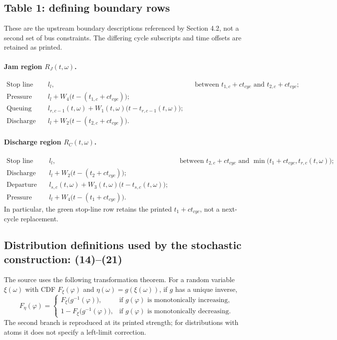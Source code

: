 \documentclass{article}
\begin{document}
\subsection*{Table 1: defining boundary rows}
These are the upstream boundary descriptions referenced by Section 4.2, not a second set of bus constraints. The differing cycle subscripts and time offsets are retained as printed.
\paragraph{Jam region \(R_J(t,\omega)\).}
\begin{align*}
\text{Stop line during red:}\quad &l_l,
&&\text{between }t_{1,c}+ct_{cyc}\text{ and }t_{2,c}+ct_{cyc};\\
\text{Pressure wave, if it exists:}\quad
&l_l+W_4\bigl(t-(t_{1,c}+ct_{cyc})\bigr);\\
\text{Queuing wave:}\quad
&l_{r,c-1}(t,\omega)+W_1(t,\omega)\bigl(t-t_{r,c-1}(t,\omega)\bigr);\\
\text{Discharge wave:}\quad
&l_l+W_2\bigl(t-(t_{2,c}+ct_{cyc})\bigr).
\end{align*}
\paragraph{Discharge region \(R_C(t,\omega)\).}
\begin{align*}
\text{Stop line during green:}\quad &l_l,
&&\text{between }t_{2,c}+ct_{cyc}\text{ and }
\min\bigl(t_1+ct_{cyc},t_{r,c}(t,\omega)\bigr);\\
\text{Discharge wave:}\quad
&l_l+W_2\bigl(t-(t_2+ct_{cyc})\bigr);\\
\text{Departure wave:}\quad
&l_{s,c}(t,\omega)+W_3(t,\omega)\bigl(t-t_{s,c}(t,\omega)\bigr);\\
\text{Pressure wave, if it exists:}\quad
&l_l+W_4\bigl(t-(t_1+ct_{cyc})\bigr).
\end{align*}
In particular, the green stop-line row retains the printed \(t_1+ct_{cyc}\), not a next-cycle replacement.

\subsection*{Distribution definitions used by the stochastic construction: (14)--(21)}
The source uses the following transformation theorem. For a random variable \(\xi(\omega)\) with CDF \(F_\xi(\varphi)\) and \(\eta(\omega)=g(\xi(\omega))\), if \(g\) has a unique inverse,
\begin{equation}
F_\eta(\varphi)=
\begin{cases}
F_\xi\bigl(g^{-1}(\varphi)\bigr),&\text{if }g(\varphi)\text{ is monotonically increasing},\\
1-F_\xi\bigl(g^{-1}(\varphi)\bigr),&\text{if }g(\varphi)\text{ is monotonically decreasing}.
\end{cases}
\tag{14}
\end{equation}
The second branch is reproduced at its printed strength; for distributions with atoms it does not specify a left-limit correction.
\end{document}
